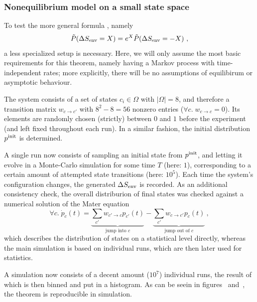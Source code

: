 \subsubsection{Nonequilibrium model on a small state space}

To test the more general formula , namely
%
\begin{equation*}
	\tilde P(\Delta S_\text{env} = X) = e^X \tilde P(\Delta S_\text{env} = -X) ~,
\end{equation*}
%
a less specialized setup is necessary. Here, we will only assume the most basic requirements for this theorem, namely having a Markov process with time-independent rates; more explicitly, there will be no assumptions of equilibirum or asymptotic behaviour.

The system consists of a set of states \(c_i\in\Omega\) with \(|\Omega| = 8\), and therefore a transition matrix \(w_{c\to c'}\) with \(8^2-8 = 56\) nonzero entries (\(\forall c.\;w_{c\to c} = 0\)). Its elements are randomly chosen (strictly) between \(0\) and \(1\) before the experiment (and left fixed throughout each run). In a similar fashion, the initial distribution \(p^{\text{init}}\) is determined.

A single run now consists of sampling an initial state from \(p^{\text{init}}\), and letting it evolve in a Monte-Carlo simulation for some time \(T\) (here: \(1\)), corresponding to a certain amount of attempted state transitions (here: \(10^5\)). Each time the system's configuration changes, the generated \(\Delta S_\text{env}\) is recorded. As an additional consistency check, the overall distriburion of final states was checked against a numerical solution of the Mater equation
%
\begin{equation}
	\forall c.\;\dot p_c(t) = \underbrace{\sum_{c'}w_{c'\to c}p_{c'}(t)}_{\text{jump into } c} - \underbrace{\sum_{c'} w_{c\to c'}p_{c}(t)}_{\text{jump out of } c} ~,
\end{equation}
%
which describes the distribution of states on a statistical level directly, whereas the main simulation is based on individual runs, which are then later used for statistics.


A simulation now consists of a decent amount (\(10^7\)) individual runs, the result of which is then binned and put in a histogram. As can be seein in figures ~and~, the theorem is reproducible in simulation.



